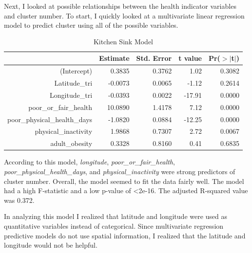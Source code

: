 \documentclass[12pt,twoside]{amherstthesis}
\begin{document}
  Next, I looked at possible relationships between the health indicator
  variables and cluster number. To start, I quickly looked at a
  multivariate linear regression model to predict cluster using all of the
  possible variables.
  
  \begin{Shaded}
  \begin{Highlighting}[]
  \StringTok{ }\OperatorTok{~}
  \end{Highlighting}
  \end{Shaded}
  
  \begin{table}[ht]
  \centering
  \begin{tabular}{rrrrr}
    \hline
   & Estimate & Std. Error & t value & Pr($>$$|$t$|$) \\ 
    \hline
  (Intercept) & 0.3835 & 0.3762 & 1.02 & 0.3082 \\ 
    Latitude\_tri & -0.0073 & 0.0065 & -1.12 & 0.2614 \\ 
    Longitude\_tri & -0.0393 & 0.0022 & -17.91 & 0.0000 \\ 
    poor\_or\_fair\_health & 10.0890 & 1.4178 & 7.12 & 0.0000 \\ 
    poor\_physical\_health\_days & -1.0820 & 0.0884 & -12.25 & 0.0000 \\ 
    physical\_inactivity & 1.9868 & 0.7307 & 2.72 & 0.0067 \\ 
    adult\_obesity & 0.3328 & 0.8160 & 0.41 & 0.6835 \\ 
     \hline
  \end{tabular}
  \caption{Kitchen Sink Model} 
  \end{table}
  
  According to this model, \emph{longitude},
  \emph{poor\_or\_fair\_health}, \emph{poor\_physical\_health\_days}, and
  \emph{physical\_inactivity} were strong predictors of cluster number.
  Overall, the model seemed to fit the data fairly well. The model had a
  high F-statistic and a low p-value of \textless{}2e-16. The adjusted
  R-squared value was 0.372.
  
  In analyzing this model I realized that latitude and longitude were used
  as quantitative variables instead of categorical. Since multivariate
  regression predictive models do not use spatial information, I realized
  that the latitude and longitude would not be helpful.
  
\end{document}
